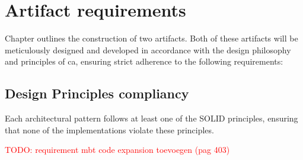 \section{Artifact requirements} \label{sec_artifact_requirements}

Chapter  outlines the construction of two artifacts. Both
of these artifacts will be meticulously designed and developed in accordance with the
design philosophy and principles of \gls{ca}, ensuring strict adherence to the following
requirements:








\subsection*{Design Principles compliancy}
Each architectural pattern follows at least one of the SOLID principles, ensuring that
none of the implementations violate these principles. 


    \textcolor{red}{TODO: requirement mbt code expansion toevoegen (pag 403)}
